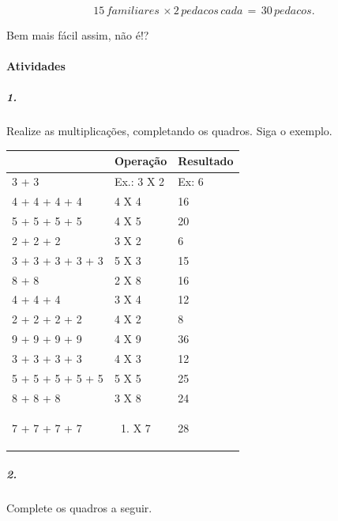 \[15\, familiares\, \times 2\, pedacos\, cada\, = \, 30\, pedacos.\ \]

Bem mais fácil assim, não é!?

\paragraph{Atividades }\label{atividades-7}

\subparagraph{1.}\label{section-89}

Realize as multiplicações, completando os quadros. Siga o exemplo.

\begin{longtable}[]{@{}lll@{}}
\toprule
& Operação & Resultado\tabularnewline
\midrule
\endhead
3 + 3 & Ex.: 3 X 2 & Ex: 6\tabularnewline
4 + 4 + 4 + 4 & 4 X 4 & 16\tabularnewline
5 + 5 + 5 + 5 & 4 X 5 & 20\tabularnewline
2 + 2 + 2 & 3 X 2 & 6\tabularnewline
3 + 3 + 3 + 3 + 3 & 5 X 3 & 15\tabularnewline
8 + 8 & 2 X 8 & 16\tabularnewline
4 + 4 + 4 & 3 X 4 & 12\tabularnewline
2 + 2 + 2 + 2 & 4 X 2 & 8\tabularnewline
9 + 9 + 9 + 9 & 4 X 9 & 36\tabularnewline
3 + 3 + 3 + 3 & 4 X 3 & 12\tabularnewline
5 + 5 + 5 + 5 + 5 & 5 X 5 & 25\tabularnewline
8 + 8 + 8 & 3 X 8 & 24\tabularnewline
\begin{minipage}[t]{0.32\columnwidth}\raggedright\strut
7 + 7 + 7 + 7\strut
\end{minipage} & \begin{minipage}[t]{0.32\columnwidth}\raggedright\strut
\begin{enumerate}
\def\labelenumi{\arabic{enumi}.}
\setcounter{enumi}{3}
\item
  X 7
\end{enumerate}\strut
\end{minipage} & \begin{minipage}[t]{0.32\columnwidth}\raggedright\strut
28\strut
\end{minipage}\tabularnewline
\bottomrule
\end{longtable}

\subparagraph{2.}\label{section-90}

Complete os quadros a seguir.

